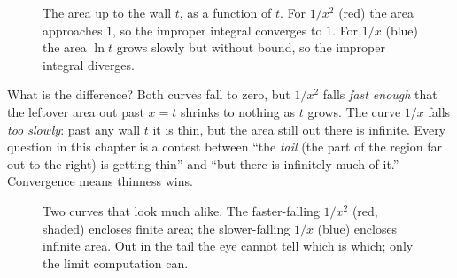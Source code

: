 \begin{figure}[htbp]
\centering
{}
\caption{The area up to the wall $t$, as a function of $t$. For $1/x^2$ (red) the
area approaches $1$, so the improper integral converges to $1$. For $1/x$ (blue)
the area $\ln t$ grows slowly but without bound, so the improper integral
diverges.}
\label{ch25:fig-area-so-far}
\end{figure}

\begin{intuitionbox}
What is the difference? Both curves fall to zero, but $1/x^2$ falls
\emph{fast enough} that the leftover area out past $x=t$ shrinks to nothing as
$t$ grows. The curve $1/x$ falls \emph{too slowly}: past any wall $t$ it is
thin, but the area still out there is infinite. Every question in this chapter
is a contest between ``the \emph{tail} (the part of the region far out to the
right) is getting thin'' and ``but there is infinitely much of it.'' Convergence
means thinness wins.
\end{intuitionbox}

\begin{figure}[H]
\centering
{}
\caption{Two curves that look much alike. The faster-falling $1/x^2$ (red,
shaded) encloses finite area; the slower-falling $1/x$ (blue) encloses infinite
area. Out in the tail the eye cannot tell which is which; only the limit
computation can.}
\label{ch25:fig-x-vs-x2}
\end{figure}

